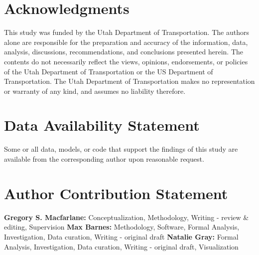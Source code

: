 \documentclass[]{ascelike-new}
\begin{document}

\section*{Acknowledgments}\label{acknowledgments}


This study was funded by the Utah Department of Transportation. The
authors alone are responsible for the preparation and accuracy of the
information, data, analysis, discussions, recommendations, and
conclusions presented herein. The contents do not necessarily reflect
the views, opinions, endorsements, or policies of the Utah Department of
Transportation or the US Department of Transportation. The Utah
Department of Transportation makes no representation or warranty of any
kind, and assumes no liability therefore.


\section*{Data Availability
Statement}\label{data-availability-statement}


Some or all data, models, or code that support the findings of this
study are available from the corresponding author upon reasonable
request.


\section*{Author Contribution
Statement}\label{author-contribution-statement}


\textbf{Gregory S. Macfarlane:} Conceptualization, Methodology, Writing
- review \& editing, Supervision \textbf{Max Barnes:} Methodology,
Software, Formal Analysis, Investigation, Data curation, Writing -
original draft \textbf{Natalie Gray:} Formal Analysis, Investigation,
Data curation, Writing - original draft, Visualization
\end{document}
